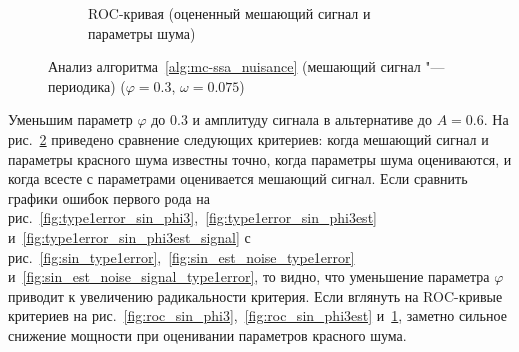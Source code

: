 \documentclass[specialist,
substylefile = spbu_report.rtx,
subf,href,colorlinks=true, 12pt]{disser}
\theoremstyle{definition}
\begin{document}
\begin{figure}[h!]
\begin{subfigure}[t]{0.5\textwidth}
		\caption{ROC-кривая (оцененный мешающий сигнал и параметры шума)}
		\label{fig:roc_sin_phi3est_signal}
	\end{subfigure}
	\caption{Анализ алгоритма~\ref{alg:mc-ssa_nuisance} (мешающий сигнал "--- периодика) ($\varphi=0.3$, $\omega=0.075$)}
\label{fig:sin_phi3}
\end{figure}
Уменьшим параметр $\varphi$ до $0.3$ и амплитуду сигнала в альтернативе до $A=0.6$. На рис.~\ref{fig:sin_phi3} приведено сравнение следующих критериев: когда мешающий сигнал и параметры красного шума известны точно, когда параметры шума оцениваются, и когда всесте с параметрами оценивается мешающий сигнал. Если сравнить графики ошибок первого рода на рис.~\ref{fig:type1error_sin_phi3},~\ref{fig:type1error_sin_phi3est} и~\ref{fig:type1error_sin_phi3est_signal} с рис.~\ref{fig:sin_type1error},~\ref{fig:sin_est_noise_type1error} и~\ref{fig:sin_est_noise_signal_type1error}, то видно, что уменьшение параметра $\varphi$ приводит к увеличению радикальности критерия. Если вглянуть на ROC-кривые критериев на рис.~\ref{fig:roc_sin_phi3},~\ref{fig:roc_sin_phi3est} и~\ref{fig:roc_sin_phi3est_signal}, заметно сильное снижение мощности при оценивании параметров красного шума.
\end{document}
